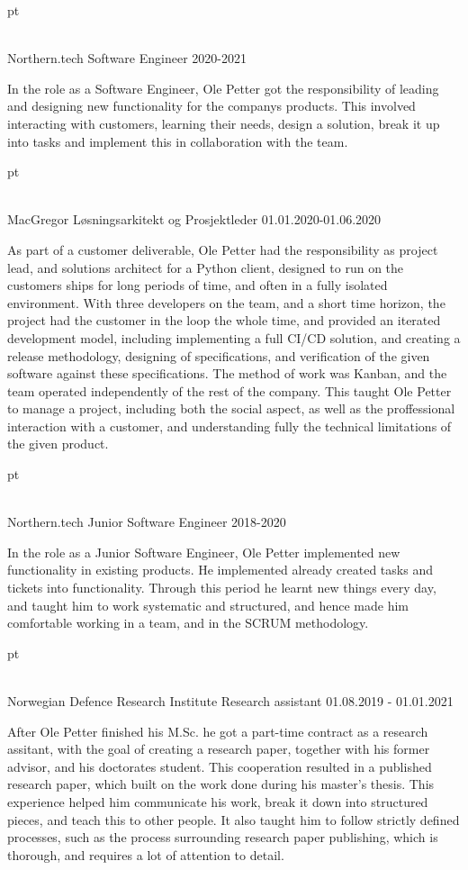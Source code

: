  pt

\\ \star Northern.tech Software Engineer 2020-2021

In the role as a Software Engineer, Ole Petter got the responsibility of leading
and designing new functionality for the companys products. This involved
interacting with customers, learning their needs, design a solution, break it up
into tasks and implement this in collaboration with the team.

 pt

\\ \star MacGregor Løsningsarkitekt og Prosjektleder 01.01.2020-01.06.2020

As part of a customer deliverable, Ole Petter had the responsibility as project
lead, and solutions architect for a Python client, designed to run on the
customers ships for long periods of time, and often in a fully isolated
environment. With three developers on the team, and a short time horizon, the
project had the customer in the loop the whole time, and provided an iterated
development model, including implementing a full CI/CD solution, and creating a
release methodology, designing of specifications, and verification of the given
software against these specifications. The method of work was Kanban, and the
team operated independently of the rest of the company. This taught Ole Petter
to manage a project, including both the social aspect, as well as the
proffessional interaction with a customer, and understanding fully the technical
limitations of the given product.

 pt

\\ \star Northern.tech Junior Software Engineer 2018-2020

In the role as a Junior Software Engineer, Ole Petter implemented new
functionality in existing products. He implemented already created tasks and
tickets into functionality. Through this period he learnt new things every day,
and taught him to work systematic and structured, and hence made him comfortable
working in a team, and in the SCRUM methodology.

 pt

\\ \star Norwegian Defence Research Institute Research assistant 01.08.2019 - 01.01.2021

After Ole Petter finished his M.Sc. he got a part-time contract as a research
assitant, with the goal of creating a research paper, together with his former
advisor, and his doctorates student. This cooperation resulted in a published
research paper, which built on the work done during his master's thesis. This
experience helped him communicate his work, break it down into structured
pieces, and teach this to other people. It also taught him to follow strictly
defined processes, such as the process surrounding research paper publishing,
which is thorough, and requires a lot of attention to detail.

